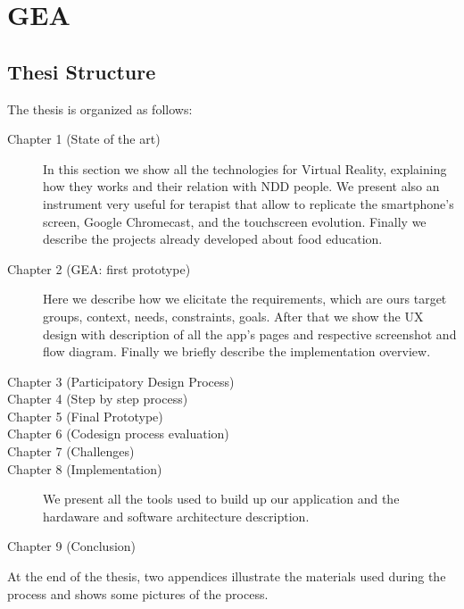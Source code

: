 \section{GEA}
\subsection{Thesi Structure}
The thesis is organized as follows:
\begin{description}
\item[Chapter 1 (State of the art)] In this section we show all the technologies for Virtual Reality, explaining how they works and their relation with NDD people. We present also an instrument very useful for terapist that allow to replicate the smartphone's screen, Google Chromecast, and the touchscreen evolution. Finally we describe the projects already developed about food education.
\item[Chapter 2 (GEA: first prototype)] Here we describe how we elicitate the requirements, which are ours target groups, context, needs, constraints, goals. After that we show the UX design with description of all the app's pages and respective screenshot and flow diagram. Finally we briefly describe the implementation overview.
\item[Chapter 3 (Participatory Design Process)]  
\item[Chapter 4 (Step by step process)]
\item[Chapter 5 (Final Prototype)] 
\item[Chapter 6 (Codesign process evaluation)]
\item[Chapter 7 (Challenges)]  
\item[Chapter 8 (Implementation)] We present all the tools used to build up our application and the hardaware and software architecture description.
\item[Chapter 9 (Conclusion)]
\end{description}
At the end of the thesis, two appendices illustrate the materials used during the process
and shows some pictures of the process.
 
